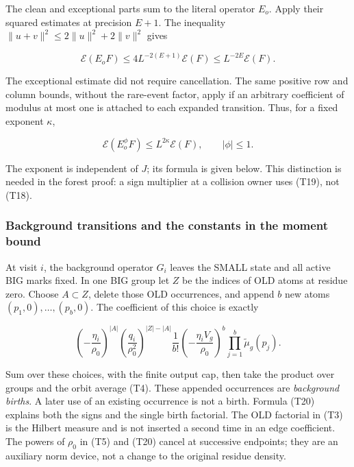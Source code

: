 The clean and exceptional parts sum to the literal operator \(E_o\).
Apply their squared estimates at precision \(E+1\). The inequality
\(\|u+v\|^2\le2\|u\|^2+2\|v\|^2\) gives

\[
\mathcal E(E_oF)\le4L^{-2(E+1)}\mathcal E(F)
                  \le L^{-2E}\mathcal E(F). \tag{T18}
\]

The exceptional estimate did not require cancellation. The same positive
row and column bounds, without the rare-event factor, apply if an
arbitrary coefficient of modulus at most one is attached to each
expanded transition. Thus, for a fixed exponent \(\kappa\),

\[
\mathcal E(E_o^\phi F)\le L^{2\kappa}\mathcal E(F),
\qquad |\phi|\le1. \tag{T19}
\]

The exponent is independent of \(J\); its formula is given below. This
distinction is needed in the forest proof: a sign multiplier at a
collision owner uses (T19), not (T18).


\hypertarget{marked-correlation-background-transitions-and-the-constants-in-the-moment-bound}{%
\subsubsection{Background transitions and the constants in the moment
bound}\label{marked-correlation-background-transitions-and-the-constants-in-the-moment-bound}}

At visit \(i\), the background operator \(G_i\) leaves the SMALL state
and all active BIG marks fixed. In one BIG group let \(Z\) be the
indices of OLD atoms at residue zero. Choose \(A\subset Z\), delete
those OLD occurrences, and append \(b\) new atoms
\((p_1,0),\ldots,(p_b,0)\). The coefficient of this choice is exactly

\[
 \left(-\frac{\eta_i}{\rho_0}\right)^{|A|}
 \left(\frac{q_i}{\rho_0^2}\right)^{|Z|-|A|}
 \frac1{b!}\left(-\frac{\eta_i V_g}{\rho_0}\right)^b
 \prod_{j=1}^b\widetilde\mu_g(p_j).
\tag{T20}
\]

Sum over these choices, with the finite output cap, then take the
product over groups and the orbit average (T4). These appended
occurrences are \emph{background births}. A later use of an existing
occurrence is not a birth. Formula (T20) explains both the signs and the
single birth factorial. The OLD factorial in (T3) is the Hilbert measure
and is not inserted a second time in an edge coefficient. The powers of
\(\rho_0\) in (T5) and (T20) cancel at successive endpoints; they are an
auxiliary norm device, not a change to the original residue density.

